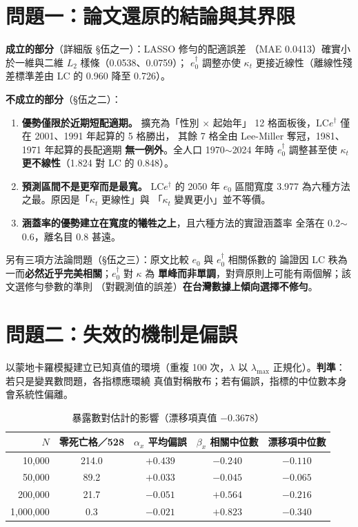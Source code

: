 \documentclass[UTF8, fontset=macnew, a4paper, 12pt]{ctexart}
\newcommand{\edag}{e_0^{\dagger}}
\newcommand{\LCe}{\mathrm{LC}e^{\dagger}}
\begin{document}
\section{問題一：論文還原的結論與其界限}

\textbf{成立的部分}（詳細版 \S 伍之一）：LASSO 修勻的配適誤差
（MAE 0.0413）確實小於一維與二維 $L_2$ 樣條（0.0538、0.0759）；
$\edag$ 調整亦使 $\kappa_t$ 更接近線性（離線性殘差標準差由 LC 的 0.960
降至 0.726）。

\textbf{不成立的部分}（\S 伍之二）：

\begin{enumerate}[leftmargin=*]
  \item \textbf{優勢僅限於近期短配適期。} 擴充為「性別 $\times$ 起始年」
        12 格面板後，$\LCe$ 僅在 2001、1991 年起算的 5 格勝出，
        其餘 7 格全由 Lee-Miller 奪冠，1981、1971 年起算的長配適期
        \textbf{無一例外}。全人口 1970$\sim$2024 年時 $\edag$ 調整甚至使
        $\kappa_t$ \textbf{更不線性}（1.824 對 LC 的 0.848）。
  \item \textbf{預測區間不是更窄而是最寬。} $\LCe$ 的 2050 年 $e_0$
        區間寬度 3.977 為六種方法之最。原因是「$\kappa_t$ 更線性」與
        「$\kappa_t$ 變異更小」並不等價。
  \item \textbf{涵蓋率的優勢建立在寬度的犧牲之上}，且六種方法的實證涵蓋率
        全落在 0.2$\sim$0.6，離名目 0.8 甚遠。
\end{enumerate}

另有三項方法論問題（\S 伍之三）：原文比較 $e_0$ 與 $\edag$ 相關係數的
論證因 LC 秩為一而\textbf{必然近乎完美相關}；$\edag$ 對 $\kappa$ 為
\textbf{單峰而非單調}，對齊原則上可能有兩個解；該文選修勻參數的準則
（對觀測值的誤差）\textbf{在台灣數據上傾向選擇不修勻}。

\section{問題二：失效的機制是偏誤}

以蒙地卡羅模擬建立已知真值的環境（重複 100 次，$\lambda$ 以
$\lambda_{\max}$ 正規化）。\textbf{判準}：若只是變異數問題，各指標應環繞
真值對稱散布；若有偏誤，指標的中位數本身會系統性偏離。

\begin{table}[H]
\centering
\caption{暴露數對估計的影響（漂移項真值 $-0.3678$）}
\small
\begin{tabular}{rcccc}
\toprule
$N$ & 零死亡格／528 & $\alpha_x$ 平均偏誤 & $\beta_x$ 相關中位數 & 漂移項中位數\\
\midrule
10,000    & 214.0 & $\mathbf{+0.439}$ & $-0.240$ & $-0.110$\\
50,000    & 89.2  & $+0.033$ & $-0.045$ & $-0.065$\\
200,000   & 21.7  & $-0.051$ & $+0.564$ & $-0.216$\\
1,000,000 & 0.3   & $-0.021$ & $+0.823$ & $-0.340$\\
\bottomrule
\end{tabular}
\end{table}
\end{document}
